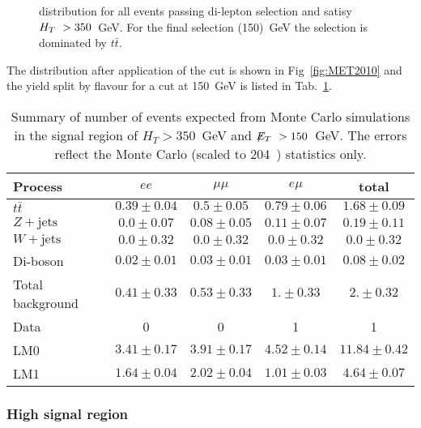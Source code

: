 \begin{figure}[hbtp]
  \hfill
  \caption{\MET distribution for all events passing di-lepton selection and satisy $H_T~> 350$~GeV. For the final \MET selection (150)~GeV the selection is dominated by $t\bar{t}$.}
\end{figure}

The \MET distribution after application of the \HT
cut is shown in Fig~\ref{fig:MET2010} and
the yield split by flavour for a cut at 150~GeV is listed in Tab.~\ref{tab:2010}.

\begin{table}[htb]
\begin{center}
\caption{\label{tab:2010}\protect Summary of number of events expected from Monte Carlo simulations in 
the signal region of $H_T> 350$~GeV and $\displaystyle{\not} E_T~> 150$~GeV. The errors reflect the Monte Carlo (scaled
    to 204~\pbi) statistics only.}
\begin{tabular}{l|ccc|c}
\hline
Process           & $ee$       & $\mu\mu$     & $e\mu$   & total   \\
\hline\hline
$t\bar{t}$       &$0.39 \pm 0.04$&$0.5 \pm 0.05$&$0.79 \pm 0.06$&$1.68 \pm 0.09$\\
$Z+\textrm{jets}$  &$0.0 \pm 0.07$&$0.08 \pm 0.05$&$0.11 \pm 0.07$&$0.19 \pm 0.11$\\
$W+\textrm{jets}$  &$0.0 \pm 0.32$&$0.0 \pm 0.32$&$0.0 \pm 0.32$&$0.0 \pm 0.32$\\
Di-boson          & $0.02 \pm 0.01$&$0.03 \pm 0.01$&$0.03 \pm 0.01$ & $0.08\pm 0.02$ \\
\hline
Total background  &$0.41 \pm 0.33$&$0.53 \pm 0.33$&$1. \pm 0.33$&$2. \pm 0.32$\\
\hline
Data  & 0 & 0 & 1 & 1 \\
\hline\hline
LM0               &$3.41 \pm 0.17$&$3.91 \pm 0.17$&$4.52 \pm 0.14$&$11.84 \pm 0.42$ \\
LM1               &$1.64 \pm 0.04$&$2.02 \pm 0.04$&$1.01 \pm 0.03$&$4.64 \pm 0.07$ \\
\hline
\end{tabular}
\end{center}
\end{table}

\subsubsection{High \HT signal region}


